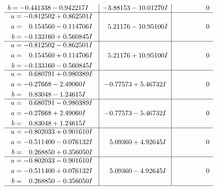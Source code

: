 \documentclass[1p]{elsarticle_modified}
\theoremstyle{definition}
\begin{document}
$$\begin{array}{c|c|c}
\begin{aligned}
b &= -0.441338 - 0.942217 I\end{aligned}
 & -3.88153 - 10.01270 I & \phantom{-0.000000 } 0 \\ \hline\begin{aligned}
u &= -0.812502 + 0.862501 I \\
a &= \phantom{-}0.154560 - 0.114706 I \\
b &= -0.133160 + 0.560845 I\end{aligned}
 & \phantom{-}5.21176 - 10.95100 I & \phantom{-0.000000 } 0 \\ \hline\begin{aligned}
u &= -0.812502 - 0.862501 I \\
a &= \phantom{-}0.154560 + 0.114706 I \\
b &= -0.133160 - 0.560845 I\end{aligned}
 & \phantom{-}5.21176 + 10.95100 I & \phantom{-0.000000 } 0 \\ \hline\begin{aligned}
u &= \phantom{-}0.680791 + 0.980389 I \\
a &= -0.27668 - 2.49060 I \\
b &= \phantom{-}0.83048 - 1.24615 I\end{aligned}
 & -0.77573 + 5.46732 I & \phantom{-0.000000 } 0 \\ \hline\begin{aligned}
u &= \phantom{-}0.680791 - 0.980389 I \\
a &= -0.27668 + 2.49060 I \\
b &= \phantom{-}0.83048 + 1.24615 I\end{aligned}
 & -0.77573 - 5.46732 I & \phantom{-0.000000 } 0 \\ \hline\begin{aligned}
u &= -0.802033 + 0.901610 I \\
a &= -0.511400 - 0.076132 I \\
b &= \phantom{-}0.268850 + 0.356050 I\end{aligned}
 & \phantom{-}5.09360 + 4.92645 I & \phantom{-0.000000 } 0 \\ \hline\begin{aligned}
u &= -0.802033 - 0.901610 I \\
a &= -0.511400 + 0.076132 I \\
b &= \phantom{-}0.268850 - 0.356050 I\end{aligned}
 & \phantom{-}5.09360 - 4.92645 I & \phantom{-0.000000 } 0\\
 \hline 
 \end{array}$$\newpage$$\begin{array}{c|c|c}  

\end{array}$$
\end{document}

